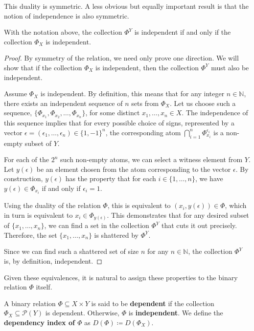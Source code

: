 This duality is symmetric. A less obvious but equally important result is that the notion of independence is also symmetric.

\begin{proposition}\label{prop:indep-equiv}
    With the notation above, the collection $\Phi^Y$ is independent if and only if the collection $\Phi_X$ is independent.
\end{proposition}

\begin{proof}

    By symmetry of the relation, we need only prove one direction. We will show that if the collection $\Phi_X$ is independent, then the collection $\Phi^Y$ must also be independent.

    Assume $\Phi_X$ is independent. By definition, this means that for any integer $n \in \mathbb{N}$, there exists an independent sequence of $n$ sets from $\Phi_X$. Let us choose such a sequence, $\{\Phi_{x_1}, \Phi_{x_2}, \dots, \Phi_{x_n}\}$, for some distinct $x_1, \dots, x_n \in X$. The independence of this sequence implies that for every possible choice of signs, represented by a vector $\epsilon = (\epsilon_1, \dots, \epsilon_n) \in \{1, -1\}^n$, the corresponding atom $\bigcap_{i=1}^n \Phi_{x_i}^{\epsilon_i}$ is a non-empty subset of $Y$.

    For each of the $2^n$ such non-empty atoms, we can select a witness element from $Y$. Let $y(\epsilon)$ be an element chosen from the atom corresponding to the vector $\epsilon$. By construction, $y(\epsilon)$ has the property that for each $i \in \{1, \dots, n\}$, we have $y(\epsilon) \in \Phi_{x_i}$ if and only if $\epsilon_i = 1$.

    Using the duality of the relation $\Phi$, this is equivalent to $(x_i, y(\epsilon)) \in \Phi$, which in turn is equivalent to $x_i \in \Phi_{y(\epsilon)}$. This demonstrates that for any desired subset of $\{x_1, \dots, x_n\}$, we can find a set in the collection $\Phi^Y$ that cuts it out precisely. Therefore, the set $\{x_1, \dots, x_n\}$ is shattered by $\Phi^Y$.

    Since we can find such a shattered set of size $n$ for any $n \in \mathbb{N}$, the collection $\Phi^Y$ is, by definition, independent.
\end{proof}

Given these equivalences, it is natural to assign these properties to the binary relation $\Phi$ itself.

\begin{definition}{\label{def:relation-dependence}}
    A binary relation $\Phi \subseteq X \times Y$ is said to be \textbf{dependent} if the collection $\Phi_X \subseteq \mathcal{P}(Y)$ is dependent. Otherwise, $\Phi$ is \textbf{independent}. We define the \textbf{dependency index of $\Phi$} as $D(\Phi) \coloneqq D(\Phi_X)$.
\end{definition}

